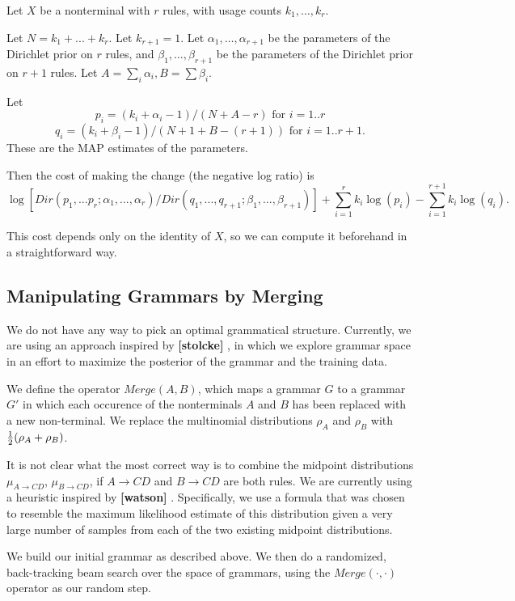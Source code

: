 \documentclass{article}
\newcommand\fakecite[1]{ {\bf [#1]} }
\begin{document}
Let $X$ be a nonterminal with $r$ rules, with usage counts $k_1, \dots,
k_r$.

Let $N = k_1 + ... + k_r$.  Let $k_{r+1} = 1$.  Let $\alpha_1, \dots,
\alpha_{r+1}$ be the parameters of the Dirichlet prior on $r$ rules,
and $\beta_1, \dots, \beta_{r+1}$ be the parameters of the Dirichlet
prior on $r+1$ rules. Let $A = \sum_i \alpha_i, B = \sum \beta_i$.

Let
$$p_i =  (k_i + \alpha_i -1) / ( N + A -r) \mbox{ for } i=1..r$$
$$q_i = (k_i + \beta_i -1) / ( N+1 + B -(r+1)) \mbox{ for } i=1..r+1.$$
These are the MAP estimates of the parameters. 

Then the cost of making the change (the negative log ratio) is
$$\log \left[ Dir(p_1,...p_r; \alpha_1,...,\alpha_r) /
Dir(q_1,...,q_{r+1}; \beta_1,...,\beta_{r+1}) \right] +
\sum_{i=1}^r k_i \log(p_i) - \sum_{i=1}^{r+1} k_i \log(q_i).$$

This cost depends only on the identity of $X$, so we can compute it
beforehand in a straightforward way.

\subsection{Manipulating Grammars by Merging}

We do not have any way to pick an optimal grammatical
structure. Currently, we are using an approach inspired by
\fakecite{stolcke}, in which we explore grammar space in an effort to
maximize the posterior of the grammar and the training data.

We define the operator $Merge(A,B)$, which maps a grammar $G$ to a
grammar $G'$ in which each occurence of the nonterminals $A$ and $B$
has been replaced with a new non-terminal. We replace the multinomial
distributions $\rho_A$ and $\rho_B$ with $\frac{1}{2}(\rho_A + \rho_B)$.  

It is not clear what the most correct way is to combine the midpoint
distributions $\mu_{A\to CD}$, $\mu_{B\to CD}$, if $A\to CD$ and $B\to
CD$ are both rules. We are currently using a heuristic inspired by
\fakecite{watson}. Specifically, we use a formula that was chosen to
resemble the maximum likelihood estimate of this distribution given a
very large number of samples from each of the two existing midpoint
distributions.

We build our initial grammar as described above. We then do a
randomized, back-tracking beam search over the space of grammars,
using the $Merge(\cdot,\cdot)$ operator as our random step.
\end{document}
